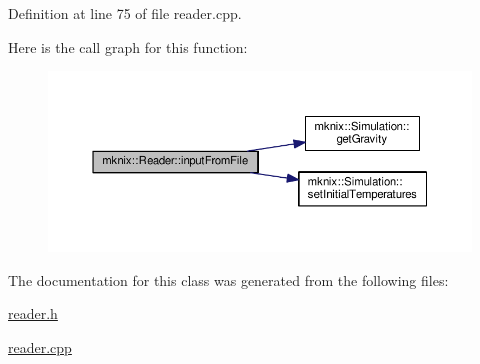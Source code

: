 Definition at line 75 of file reader.\+cpp.



Here is the call graph for this function\+:\nopagebreak
\begin{figure}[H]
\begin{center}
\leavevmode
\includegraphics[width=350pt]{d0/d66/classmknix_1_1_reader_ab1aedea0c0f3381e66dfc80a0d1344fe_cgraph}
\end{center}
\end{figure}




The documentation for this class was generated from the following files\+:\begin{DoxyCompactItemize}
\item 
\hyperlink{reader_8h}{reader.\+h}\item 
\hyperlink{reader_8cpp}{reader.\+cpp}\end{DoxyCompactItemize}
